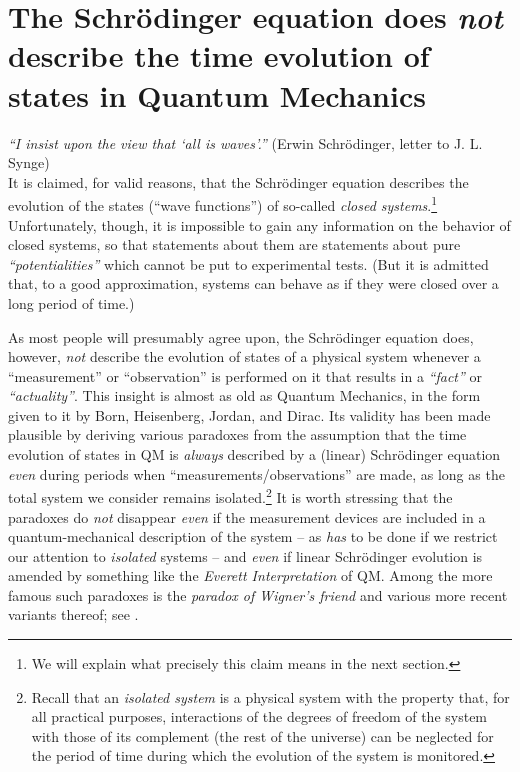 \documentclass[12pt]{article}
\begin{document}
\section{The Schr\"odinger equation does \textit{not} describe the time evolution of states in Quantum Mechanics}\label{Schroedinger evol}
\hspace{0.5cm}\textit{``I insist upon the view that `all is waves'.''} (Erwin Schr\"odinger, letter to J. L. Synge)\\

It is claimed, for valid reasons, that the Schr\"odinger equation describes the evolution of the states
(``wave functions'') of so-called \textit{closed systems}.\footnote{We will explain what precisely this claim means in the next section.}
 Unfortunately, though, it is impossible to gain any information on the behavior of closed systems, so that
statements about them are statements about pure \textit{``potentialities''} which cannot be put to experimental tests.
(But it is admitted that, to a good approximation, systems can behave as if they were closed over a long period of time.)

As most people will presumably agree upon, the Schr\"odinger equation does, however,
\textit{not} describe the evolution of states of a physical system whenever a ``measurement'' or ``observation'' is
performed on it that results in a \textit{``fact''} or \textit{``actuality''}. This insight is almost as old as Quantum Mechanics,
in the form given to it by Born, Heisenberg, {Jordan}, and {Dirac}. Its validity has been made
plausible by deriving various paradoxes from the assumption that the time evolution of states in QM is \textit{always}
described by a (linear) Schr\"odinger equation \textit{even} during periods when ``measurements/observations''
are made, as long as the total system we consider remains isolated.\footnote{Recall that an \textit{isolated system}
is a physical system with the property that, for all practical purposes, interactions of the degrees of freedom of the
system with those of its complement (the rest of the universe) can be neglected for the period of time during which
the evolution of the system is monitored.}
It is worth stressing that the paradoxes do \textit{not} disappear \textit{even} if the measurement devices are included
in a quantum-mechanical description of the system -- as \textit{has} to be done if we restrict our attention to
\textit{isolated} systems -- and \textit{even} if linear Schr\"odinger evolution is amended by something like the
\textit{Everett Interpretation} \cite{Everett} of QM. Among the more famous such paradoxes is the \textit{paradox
of Wigner's friend} \cite{Wigner} and various more recent variants thereof; see \cite{Hardy, FR}.
\end{document}
